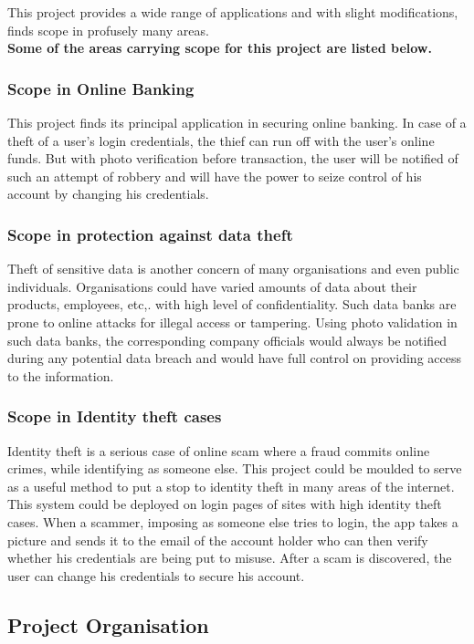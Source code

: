 \documentclass[12pt, oneside, a4paper]{article}
\begin{document}
This project provides a wide range of applications and with slight modifications, finds scope in profusely many areas.\\
\textbf{Some of the areas carrying scope for this project are listed below.}

\subsubsection{Scope in Online Banking}
This project finds its principal application in securing online banking. In case of a theft of a user's login credentials, the thief can run off with the user's online funds. But with photo verification before transaction, the user will be notified of such an attempt of robbery and will have the power to seize control of his account by changing his credentials.
\subsubsection{Scope in protection against data theft}
Theft of sensitive data is another concern of many organisations and even public individuals. Organisations could have varied amounts of data about their products, employees, etc,. with high level of confidentiality. Such data banks are prone to online attacks for illegal access or tampering. Using photo validation in such data banks, the corresponding company officials would always be notified during any potential data breach and would have full control on providing access to the information.
\subsubsection{Scope in Identity theft cases}
Identity theft is a serious case of online scam where a fraud commits online crimes, while identifying as someone else. This project could be moulded to serve as a useful method to put a stop to identity theft in many areas of the internet. This system could be deployed on login pages of sites with high identity theft cases. When a scammer, imposing as someone else tries to login, the app takes a picture and sends it to the email of the account holder who can then verify whether his credentials are being put to misuse. After a scam is discovered, the user can change his credentials to secure his account. 

\pagebreak

\subsection{Project Organisation}
\vspace{1cm}
\end{document}
